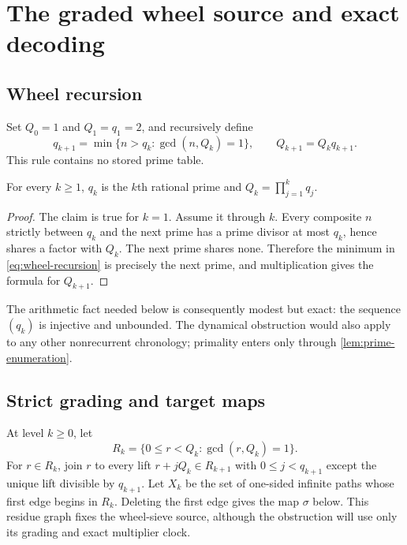 \section{The graded wheel source and exact decoding}
\label{sec:setup}

\subsection{Wheel recursion}

Set $Q_0=1$ and $Q_1=q_1=2$, and recursively define
\begin{equation}
q_{k+1}=\min\{n>q_k:\gcd(n,Q_k)=1\},
\qquad
Q_{k+1}=Q_kq_{k+1}.
\label{eq:wheel-recursion}
\end{equation}
This rule contains no stored prime table.

\begin{lemma}
\label{lem:prime-enumeration}
For every $k\ge1$, $q_k$ is the $k$th rational prime and
$Q_k=\prod_{j=1}^kq_j$.
\end{lemma}

\begin{proof}
The claim is true for $k=1$.  Assume it through $k$.  Every composite
$n$ strictly between $q_k$ and the next prime has a prime divisor at most
$q_k$, hence shares a factor with $Q_k$.  The next prime shares none.
Therefore the minimum in \eqref{eq:wheel-recursion} is precisely the next
prime, and multiplication gives the formula for $Q_{k+1}$.
\end{proof}

The arithmetic fact needed below is consequently modest but exact: the
sequence $(q_k)$ is injective and unbounded.  The dynamical obstruction would
also apply to any other nonrecurrent chronology; primality enters only
through \cref{lem:prime-enumeration}.

\subsection{Strict grading and target maps}

At level $k\ge0$, let
\[
R_k=\{0\le r<Q_k:\gcd(r,Q_k)=1\}.
\]
For $r\in R_k$, join $r$ to every lift
$r+jQ_k\in R_{k+1}$ with $0\le j<q_{k+1}$ except the unique lift divisible
by $q_{k+1}$.  Let $X_k$ be the set of one-sided infinite paths whose first
edge begins in $R_k$.  Deleting the first edge gives the map $\sigma$ below.
This residue graph fixes the wheel-sieve source, although the obstruction
will use only its grading and exact multiplier clock.


